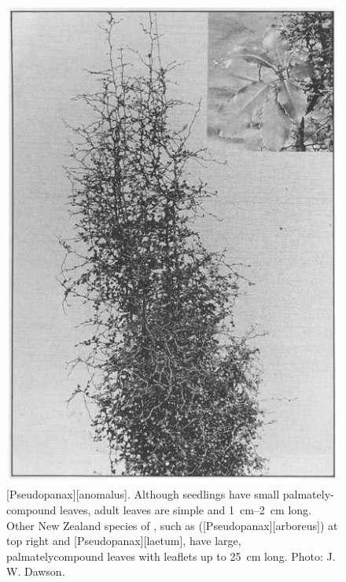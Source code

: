 \begin{figure}[htb]
	\centering
	\begin{minipage}[t]{0.347\textwidth}
		\centering
		\includegraphics[width=\textwidth]{graphics/figure76pseudopanax.jpg}
    	\caption[\emph{Pseudopanax anomalus}]{[Pseudopanax][anomalus].
    	Although seedlings have small palmately-compound leaves, adult leaves are simple and \SIrange{1}{2}{\centi\metre} long.
    	Other New Zealand species of , such as  ([Pseudopanax][arboreus]) at top right and [Pseudopanax][laetum], have large, palmatelycompound leaves with leaflets up to \SI{25}{\centi\metre} long. Photo:  J. W. Dawson.}%
    	\label{fig:76pseudopanax}
	\end{minipage}\hfill%
	\begin{minipage}[t]{0.633\textwidth}

\end{minipage}
\end{figure}

